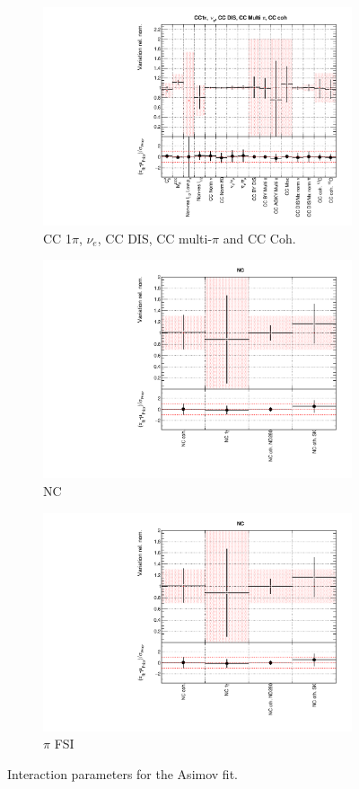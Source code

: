 \begin{figure}[!htbp]
\begin{subfigure}{0.49\textwidth}
  \centering
  \includegraphics[width=0.9\linewidth]{figs/asmvxsecpoly3}
  \caption{CC 1$\pi$, $\nu_e$, CC DIS, CC multi-$\pi$ and CC Coh.}
\end{subfigure}
\begin{subfigure}{0.49\textwidth}
  \centering
  \includegraphics[width=0.9\linewidth]{figs/asmvxsecpoly4}
  \caption{NC}
\end{subfigure}
\begin{subfigure}{0.49\textwidth}
  \centering
  \includegraphics[width=0.9\linewidth]{figs/asmvxsecpoly4}
  \caption{$\pi$ FSI}
\end{subfigure}
\caption{Interaction parameters for the Asimov fit.}
\label{fig:asmvxsecapp}
\end{figure}

